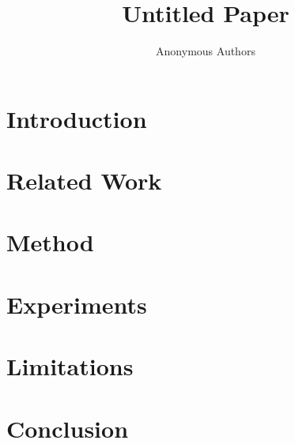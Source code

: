 \documentclass[11pt]{article}
\title{Untitled Paper}
\author{Anonymous Authors}
\begin{document}
\maketitle
\begin{abstract}
\end{abstract}
\section{Introduction}
\section{Related Work}
\section{Method}
\section{Experiments}
\section{Limitations}
\section{Conclusion}

\end{document}
